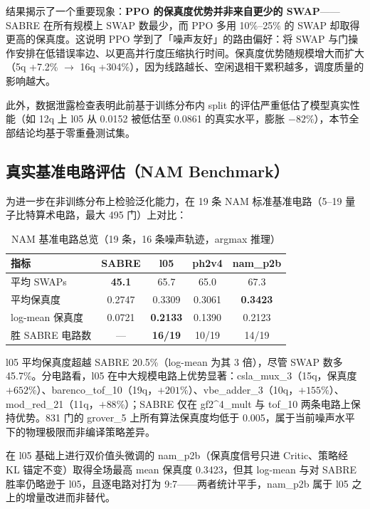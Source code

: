 结果揭示了一个重要现象：\textbf{PPO 的保真度优势并非来自更少的 SWAP}——SABRE 在所有规模上 SWAP 数最少，而 PPO 多用 10\%--25\% 的 SWAP 却取得更高的保真度。这说明 PPO 学到了「噪声友好」的路由偏好：将 SWAP 与门操作安排在低错误率边、以更高并行度压缩执行时间。保真度优势随规模增大而扩大（5q +7.2\% $\to$ 16q +304\%），因为线路越长、空闲退相干累积越多，调度质量的影响越大。

此外，数据泄露检查表明此前基于训练分布内 split 的评估严重低估了模型真实性能（如 12q 上 l05 从 0.0152 被低估至 0.0861 的真实水平，膨胀 $-82\%$），本节全部结论均基于零重叠测试集。

\subsection{真实基准电路评估（NAM Benchmark）}
\label{sec:nam-benchmark}

为进一步在非训练分布上检验泛化能力，在 19 条 NAM 标准基准电路（5--19 量子比特算术电路，最大 495 门）上对比：

\begin{table}[htbp]
\centering
\caption{NAM 基准电路总览（19 条，16 条噪声轨迹，argmax 推理）}
\label{tab:nam-overview}
\small
\begin{tabular}{l|cccc}
\hline
指标 & SABRE & l05 & ph2v4 & nam\_p2b \\
\hline
平均 SWAPs & \textbf{45.1} & 65.7 & 65.0 & 67.3 \\
平均保真度 & 0.2747 & 0.3309 & 0.3061 & \textbf{0.3423} \\
log-mean 保真度 & 0.0721 & \textbf{0.2133} & 0.1390 & 0.2123 \\
胜 SABRE 电路数 & --- & \textbf{16/19} & 10/19 & 14/19 \\
\hline
\end{tabular}
\end{table}

l05 平均保真度超越 SABRE 20.5\%（log-mean 为其 3 倍），尽管 SWAP 数多 45.7\%。分电路看，l05 在中大规模电路上优势显著：csla\_mux\_3（15q，保真度 $+652\%$）、barenco\_tof\_10（19q，$+201\%$）、vbe\_adder\_3（10q，$+155\%$）、mod\_red\_21（11q，$+88\%$）；SABRE 仅在 gf2\textasciicircum 4\_mult 与 tof\_10 两条电路上保持优势。831 门的 grover\_5 上所有算法保真度均低于 0.005，属于当前噪声水平下的物理极限而非编译策略差异。

在 l05 基础上进行双价值头微调的 nam\_p2b（保真度信号只进 Critic、策略经 KL 锚定不变）取得全场最高 mean 保真度 0.3423，但其 log-mean 与对 SABRE 胜率仍略逊于 l05，且逐电路对打为 9:7——两者统计平手，nam\_p2b 属于 l05 之上的增量改进而非替代。

